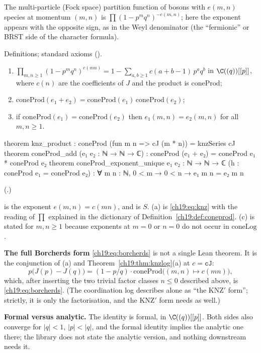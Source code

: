 \begin{physics}
The multi-particle (Fock space) partition function of bosons with $e(m,n)$ species at momentum $(m,n)$ is
$\prod(1-p^mq^n)^{-e(m,n)}$; here the exponent appears with the opposite sign, as in the Weyl denominator (the ``fermionic''
or BRST side of the character formula).
\end{physics}
\begin{status}Definitions; standard axioms ().\end{status}

\begin{theorem}\label{ch19:thm:knzproduct}
\begin{enumerate}[label=(\alph*)]
\item $\prod_{m,n\ge1}(1-p^mq^n)^{c(mn)}=1-\sum_{a,b\ge1}c(a+b-1)\,p^aq^b$ in $\C((q))[[p]]$, where $c(n)$ are the
  coefficients of $J$ and the product is $\mathrm{coneProd}$;
\item $\mathrm{coneProd}(e_1+e_2)=\mathrm{coneProd}(e_1)\,\mathrm{coneProd}(e_2)$;
\item if $\mathrm{coneProd}(e_1)=\mathrm{coneProd}(e_2)$ then $e_1(m,n)=e_2(m,n)$ for all $m,n\ge1$.
\end{enumerate}
\end{theorem}
\begin{leancode}
theorem knz_product : coneProd (fun m n => cJ (m * n)) = knzSeries cJ
theorem coneProd_add (e₁ e₂ : ℕ → ℕ → ℂ) : coneProd (e₁ + e₂) = coneProd e₁ * coneProd e₂
theorem coneProd_exponent_unique {e₁ e₂ : ℕ → ℕ → ℂ} (h : coneProd e₁ = coneProd e₂) :
    ∀ m n : ℕ, 0 < m → 0 < n → e₁ m n = e₂ m n
\end{leancode}
(.)
\begin{dictionary}
 is the exponent $e(m,n)=c(mn)$, and  is $S$.  (a) is \eqref{ch19:eq:knz}
with the reading of $\prod$ explained in the dictionary of Definition~\ref{ch19:def:coneprod}.  (c) is stated for
$m,n\ge1$ because exponents at $m=0$ or $n=0$ do not occur in $\mathrm{coneLog}$.

\textbf{The full Borcherds form} \eqref{ch19:eq:borcherds} is not a single Lean theorem.  It is the conjunction of (a)
and Theorem~\ref{ch19:thm:knzlog}(a) at $c=\mathtt{cJ}$:
\begin{equation*}
  p\bigl(J(p)-J(q)\bigr)=(1-p/q)\cdot\mathrm{coneProd}\bigl((m,n)\mapsto c(mn)\bigr),
\end{equation*}
which, after inserting the two trivial factor classes $n\le0$ described above, is \eqref{ch19:eq:borcherds}.  (The
coordination log describes  alone as ``the KNZ$'$ form''; strictly, it is only the factorisation,
and the KNZ$'$ form needs  as well.)

\textbf{Formal versus analytic.}  The identity is formal, in $\C((q))[[p]]$.  Both sides also converge for $|q|<1$,
$|p|<|q|$, and the formal identity implies the analytic one there; the library does not state the analytic version,
and nothing downstream needs it.
\end{dictionary}
